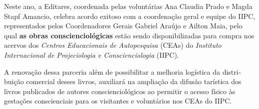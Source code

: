 \documentclass{gescons}
\begin{document}
\vspace{20mm}

Neste ano, a Editares, coordenada pelas voluntárias Ana Claudia Prado e Magda Stapf Amancio, celebra acordo exitoso com a coordenação geral e equipe do IIPC, representados pelos Coordenadores Gerais Gabriel Araújo e Ailton Maia, pelo qual \textbf{as obras conscienciológicas} estão sendo disponibilizadas para compra nos acervos dos \emph{Centros Educacionais de Autopesquisa} (CEAs) do \emph{Instituto Internacional de Projeciologia e Cons­cienciologia} (IIPC).

A renovação dessa parceria além de possibilitar a melhoria logística da distri­buição comercial desses livros, auxiliará na ampliação da difusão tarística dos livros pu­blicados de autores conscienciológicos ao permitir o acesso físico às gestações conscien­ciais para os visitantes e voluntários nos CEAs do IIPC.












\end{document}
